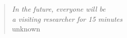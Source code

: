 \begin{quote}
\begin{flushright}
\null {}
\emph{In the future, everyone will be \\
  a visiting researcher for 15 minutes}\\
\vspace*{1cm}
  unknown
\null
\end{flushright}
\end{quote}
